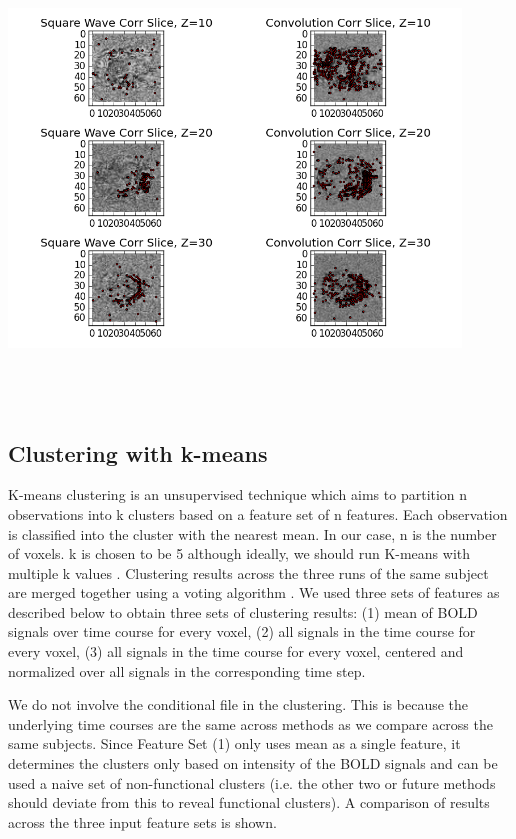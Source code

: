 \documentclass[11pt]{article}
\begin{document}
\centering
\includegraphics[width=12cm, height=12cm]{compare_correlations.png}


\subsection{Clustering with k-means}

K-means clustering is an unsupervised technique which aims to partition n
observations into k clusters based on a feature set of n features. Each
observation is classified into the cluster with the nearest mean. In our case, n
is the number of voxels. k is chosen to be 5 although ideally, we should run
K-means with multiple k values \cite{venkataraman2009}. Clustering results
across the three runs of the same subject are merged together using a voting
algorithm \cite{dimitriadou2002}. We used three sets of features as described
below to obtain three sets of clustering results: (1) mean of BOLD signals over
time course for every voxel, (2) all signals in the time course for every voxel,
(3) all signals in the time course for every voxel, centered and normalized over
all signals in the corresponding time step. 

We do not involve the conditional file in the clustering. This is because the
underlying time courses are the same across methods as we compare across the
same subjects. Since Feature Set (1) only uses mean as a single feature, it
determines the clusters only based on intensity of the BOLD signals and can be
used a naive set of non-functional clusters (i.e. the other two or future
methods should deviate from this to reveal functional clusters). A comparison of
results across the three input feature sets is shown.
\end{document}

